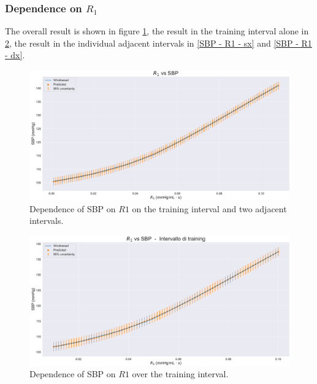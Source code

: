 \newpage

\subsubsection{Dependence on $R_1$}
The overall result is shown in figure \ref{SBP - R1 - full}, the result in the training interval alone in \ref{SBP - R1 - training}, the result in the individual adjacent intervals in \ref{SBP - R1 - sx} and \ref{SBP - R1 - dx}.

\vspace{0.7cm}


\begin{figure}[!htb]
    \centering
    \includegraphics[width=1\textwidth]{images/Training (risultati)/SBP/SBP - R1 - full.pdf}
    \caption{Dependence of SBP on $R1$ on the training interval and two adjacent intervals.}
    \label{SBP - R1 - full}
\end{figure}

\vspace{0.32cm}

\begin{figure}[!htb]
    \centering
    \includegraphics[width=1\textwidth]{images/Training (risultati)/SBP/SBP - R1 - training.pdf}
    \caption{Dependence of SBP on $R1$ over the training interval.}
    \label{SBP - R1 - training}
\end{figure}

